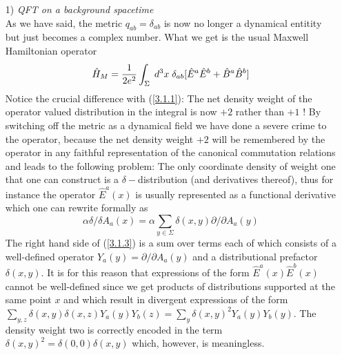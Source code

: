 \documentclass[12pt]{report}
\def\be{\begin{equation}}
\def\ee{\end{equation}}
\def\green{\relax}
\begin{document}
\begin{itemize}
%
\item[1)] {\it QFT on a background spacetime}\\
As we have said, the metric $q_{ab}=\delta_{ab}$ is now no longer a 
dynamical entitity but just becomes a complex number. What we get is the
usual Maxwell Hamiltonian operator
\be \label{3.1.2}
\hat{H}_M=\frac{1}{2 e^2}\int_\Sigma\; d^3x \; 
\delta_{ab}
{\green [\hat{E}^a \hat{E}^b+\hat{B}^a \hat{B}^b]}
\ee
Notice the crucial difference with (\ref{3.1.1}): The net density weight
of the operator valued distribution in the integral is now $+2$ rather 
than $+1$ ! By switching off the metric as a dynamical field we have done 
a severe crime to the operator, because the net density weight $+2$ will
be remembered by the operator in any faithful representation of the 
canonical commutation relations and leads to the following problem:
The only coordinate density of weight one that one can construct 
is a $\delta-$distribution (and derivatives thereof), thus for instance 
the operator $\hat{E}^a(x)$ is usually represented as a functional 
derivative which one can rewrite formally as
\be \label{3.1.3}
\alpha \delta/\delta A_a(x)=\alpha\sum_{y\in \Sigma} 
\delta(x,y) 
\partial/\partial A_a(y)  
\ee
The right hand side of (\ref{3.1.3}) is a sum over terms each of which
consists of a well-defined operator $Y_a(y)=\partial/\partial A_a(y)$
and a distributional prefactor $\delta(x,y)$. It is for this reason
that expressions of the form $\hat{E}^a(x)\hat{E}^b(x)$ cannot be 
well-defined since we get products of distributions supported at the same 
point $x$ and which result in divergent expressions of the form
$\sum_{y,z} \delta(x,y)\delta(x,z)  Y_a(y) Y_b(z)
=\sum_y \delta(x,y)^2  Y_a(y) Y_b(y)$. The density weight two is correctly
encoded in the term $\delta(x,y)^2=\delta(0,0)\delta(x,y)$ which, however,
is meaningless. 


\end{itemize}
\end{document}
